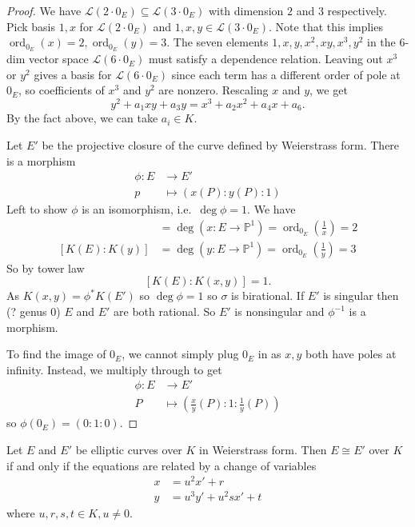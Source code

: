 \documentclass[a4paper]{article}
\theoremstyle{definition}
\renewcommand*{\P}{\mathbb{P}}
\DeclareMathOperator{\ord}{ord}
\begin{document}
\begin{proof}
  We have \(\mathcal L(2 \cdot 0_E) \subseteq \mathcal L(3 \cdot 0_E)\) with dimension \(2\) and \(3\) respectively. Pick basis \(1, x\) for \(\mathcal L(2 \cdot 0_E)\) and \(1, x, y \in \mathcal L(3 \cdot 0_E)\). Note that this implies \(\ord_{0_E}(x) = 2, \ord_{0_E}(y) = 3\). The seven elements \(1, x, y, x^2, xy, x^3, y^2\) in the \(6\)-dim vector space \(\mathcal L(6 \cdot 0_E)\) must satisfy a dependence relation. Leaving out \(x^3\) or \(y^2\) gives a basis for \(\mathcal L(6 \cdot 0_E)\) since each term has a different order of pole at \(0_E\), so coefficients of \(x^3\) and \(y^2\) are nonzero. Rescaling \(x\) and \(y\), we get
  \[
    y^2 + a_1 xy + a_3 y = x^3 + a_2 x^2 + a_4 x + a_6.
  \]
  By the fact above, we can take \(a_i \in K\).

  Let \(E'\) be the projective closure of the curve defined by Weierstrass form. There is a morphism
  \begin{align*}
    \phi: E &\to E' \\
    p &\mapsto (x(P) : y(P) : 1)
  \end{align*}
  Left to show \(\phi\) is an isomorphism, i.e.\ \(\deg \phi = 1\). We have
  \begin{align*}
    [K(E) : K(x)] &= \deg (x: E \to \P^1) = \ord_{0_E}(\frac{1}{x}) = 2 \\
    [K(E) : K(y)] &= \deg (y: E \to \P^1) = \ord_{0_E}(\frac{1}{y}) = 3
  \end{align*}
  So by tower law
  \[
    [K(E): K(x, y)] = 1.
  \]
  As \(K(x, y) = \phi^* K(E')\) so \(\deg \phi = 1\) so \(\sigma\) is birational. If \(E'\) is singular then (? genus 0) \(E\) and \(E'\) are both rational. So \(E'\) is nonsingular and \(\phi^{-1}\) is a morphism.

  To find the image of \(0_E\), we cannot simply plug \(0_E\) in as \(x, y\) both have poles at infinity. Instead, we multiply through to get
  \begin{align*}
    \phi: E &\to E' \\
    P &\mapsto (\frac{x}{y} (P) : 1 : \frac{1}{y} (P))
  \end{align*}
  so \(\phi(0_E) = (0 : 1 : 0)\).
\end{proof}

\begin{proposition}
  Let \(E\) and \(E'\) be elliptic curves over \(K\) in Weierstrass form. Then \(E \cong E'\) over \(K\) if and only if the equations are related by a change of variables
  \begin{align*}
    x &= u^2 x' + r \\
    y &= u^3 y' + u^2 s x' + t
  \end{align*}
  where \(u, r, s, t \in K, u \neq 0\).
\end{proposition}
\end{document}
